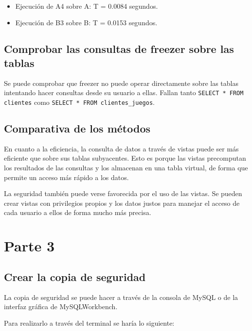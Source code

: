 \documentclass[a4paper, 11pt, oneside]{article} %
\begin{document}
\begin{itemize}
	\item Ejecución de A4 sobre A: T = 0.0084 segundos.
	\item Ejecución de B3 sobre B: T = 0.0153 segundos.
\end{itemize}

\subsection{Comprobar las consultas de freezer sobre las tablas}

Se puede comprobar que freezer no puede operar directamente sobre las tablas intentando hacer consultas desde su usuario a ellas. Fallan tanto \texttt{SELECT * FROM clientes} como \texttt{SELECT * FROM clientes_juegos}.

\subsection{Comparativa de los métodos}

En cuanto a la eficiencia, la consulta de datos a través de vistas puede ser más eficiente que sobre sus tablas subyacentes. Esto es porque las vistas precomputan los resultados de las consultas y los almacenan en una tabla virtual, de forma que permite un acceso más rápido a los datos.

La seguridad también puede verse favorecida por el uso de las vistas. Se pueden crear vistas con privilegios propios y los datos justos para manejar el acceso de cada usuario a ellos de forma mucho más precisa.


\section{Parte 3}

\subsection{Crear la copia de seguridad}

La copia de seguridad se puede hacer a través de la consola de MySQL o de la interfaz gráfica de MySQLWorkbench.

Para realizarlo a través del terminal se haría lo siguiente:

\end{document}
